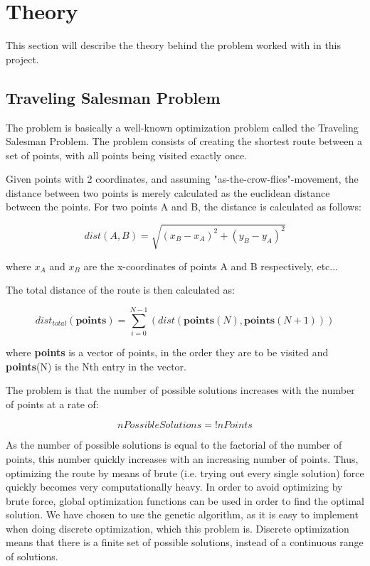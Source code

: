 
\chapter{Theory}
This section will describe the theory behind the problem worked with in this project.

\section{Traveling Salesman Problem}
The problem is basically a well-known optimization problem called the Traveling Salesman Problem\cite{wiki:TSP}. The problem consists of creating the shortest route between a set of points, with all points being visited exactly once. 

Given points with 2 coordinates, and assuming "as-the-crow-flies"-movement, the distance between two points is merely calculated as the euclidean distance between the points. For two points A and B, the distance is calculated as follows:

\begin{equation}
	dist(A,B) = \sqrt{(x_B - x_A)^2 + (y_B - y_A)^2}
\end{equation}

where $x_A$ and $x_B$ are the x-coordinates of points A and B respectively, etc...

The total distance of the route is then calculated as:

\begin{equation}
	dist_{total}(\textbf{points}) = \sum_{i=0}^{N-1}(dist(\textbf{points}(N),\textbf{points}(N+1)))
\end{equation}

where \textbf{points} is a vector of points, in the order they are to be visited and \textbf{points}(N) is the Nth entry in the vector.

The problem is that the number of possible solutions increases with the number of points at a rate of:

\begin{equation}
	nPossibleSolutions=!nPoints
\end{equation}

\label{eq:number_of_possible_solutions}
As the number of possible solutions is equal to the factorial of the number of points, this number quickly increases with an increasing number of points. Thus, optimizing the route by means of brute (i.e. trying out every single solution) force quickly becomes very computationally heavy. In order to avoid optimizing by brute force, global optimization functions can be used in order to find the optimal solution. We have chosen to use the genetic algorithm, as it is easy to implement when doing discrete optimization, which this problem is. Discrete optimization means that there is a finite set of possible solutions, instead of a continuous range of solutions.

